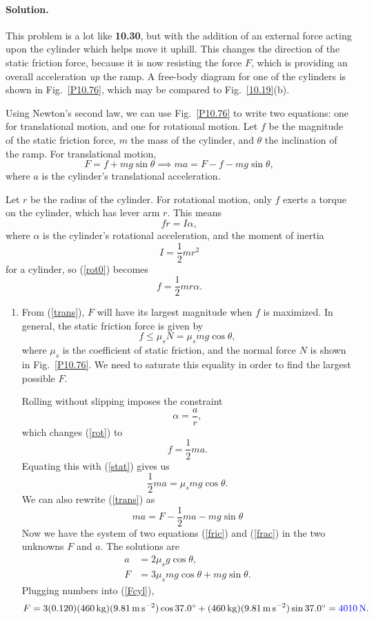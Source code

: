 \documentclass[11pt]{article}
\newcommand{\refeq}[1]{(\ref{#1})}
\newcommand{\beq}{\begin{equation*}}
\newcommand{\eeq}{\end{equation*}}
\newcommand{\beqn}{\begin{equation}}
\newcommand{\eeqn}{\end{equation}}
\newenvironment{solution}
{
    \paragraph{Solution.}
    \ignorespaces
}
{
    \bigskip
}
\begin{document}
\begin{solution}
	This problem is a lot like \textbf{10.30}, but with the addition of an external force acting upon the cylinder which helps move it uphill.  This changes the direction of the static friction force, because it is now resisting the force $F$, which is providing an overall acceleration \emph{up} the ramp.  A free-body diagram for one of the cylinders is shown in Fig.~\ref{P10.76}, which may be compared to Fig.~\ref{10.19}(b).
	
	Using Newton's second law, we can use Fig.~\ref{P10.76} to write two equations: one for translational motion, and one for rotational motion.  Let $f$ be the magnitude of the static friction force, $m$ the mass of the cylinder, and $\theta$ the inclination of the ramp.  For translational motion,
	\beqn \label{trans}
		F = f + m g \sin{\theta} \implies ma = F - f - m g \sin{\theta},
	\eeqn
	where $a$ is the cylinder's translational acceleration.
	
	Let $r$ be the radius of the cylinder.  For rotational motion, only $f$ exerts a torque on the cylinder, which has lever arm $r$.  This means
	\beqn \label{rot0}
		f r = I \alpha,
	\eeqn
	where $\alpha$ is the cylinder's rotational acceleration, and the moment of inertia
	\beq
		I = \frac{1}{2} m r^2
	\eeq
	for a cylinder, so \refeq{rot0} becomes
	\beqn \label{rot}
		f = \frac{1}{2} m r \alpha.
	\eeqn
	
	\begin{enumerate}
		\item From \refeq{trans}, $F$ will have its largest magnitude when $f$ is maximized.  In general, the static friction force is given by
			\beqn \label{stat}
				f \leq \mu_s N = \mu_s m g \cos \theta,
			\eeqn
			where $\mu_s$ is the coefficient of static friction, and the normal force $N$ is shown in Fig.~\ref{P10.76}.  We need to saturate this equality in order to find the largest possible $F$.
		
		Rolling without slipping imposes the constraint
			\beq
				\alpha = \frac{a}{r},
			\eeq
			which changes \refeq{rot} to
			\beq
				f = \frac{1}{2} m a.
			\eeq
			Equating this with \refeq{stat} gives us
			\beqn \label{fric}
				\frac{1}{2} m a = \mu_s m g \cos \theta.
			\eeqn
			We can also rewrite \refeq{trans} as
			\beqn \label{frac}
				ma = F - \frac{1}{2} m a - m g \sin{\theta}
			\eeqn
			Now we have the system of two equations \refeq{fric} and \refeq{frac} in the two unknowns $F$ and $a$.  The solutions are
			\begin{align}
				a &= 2 \mu_s g \cos{\theta}, \label{acyl} \\
				F &= 3 \mu_s m g \cos{\theta} + m g \sin{\theta}. \label{Fcyl}
			\end{align}
			Plugging numbers into \refeq{Fcyl},
			\beq
				F = 3 (0.120) (\SI{460}{\kg}) (\sig) \cos{37.0^\circ} + (\SI{460}{\kg}) (\sig) \sin{37.0^\circ} = {\color{blue} \SI{4010}{\newton}}.
			\eeq
			

\end{enumerate}
\end{solution}
\end{document}
